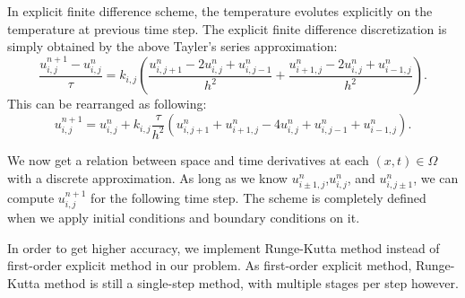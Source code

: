\documentclass[10pt,a4paper]{report}
\begin{document}
In explicit finite difference scheme, the temperature evolutes explicitly on the temperature at previous time step. The explicit finite difference discretization is simply obtained by the above Tayler's series approximation: 
\begin{equation}
{\frac{u^{n+1}_{i,j}-u^n_{i,j}}{\tau}}=k_{i,j}({\frac{u^n_{i,j+1}-2u^n_{i,j}+u^n_{i,j-1}}{h^2}}+{\frac{u^n_{i+1,j}-2u^n_{i,j}+u^n_{i-1,j}}{h^2}}).
\end{equation}
\[\]
This can be rearranged as following:
\begin{equation}
u^{n+1}_{i,j}=u^{n}_{i,j}+k_{i,j}{\frac{\tau}{h^2}}(u^n_{i,j+1}+u^n_{i+1,j}-4u^n_{i,j}+u^n_{i,j-1}+u^n_{i-1,j}).
\end{equation}
\[\]

We now get a relation between space and time derivatives at each $(x,t)\in \Omega$ with a discrete approximation. As long as we know $u^n_{i\pm 1,j}$,$u^n_{i,j}$, and $u^n_{i,j\pm 1}$, we can compute $u^{n+1}_{i,j}$ for the following time step. The scheme is completely defined when we apply initial conditions and boundary conditions on it.

In order to get higher accuracy, we implement Runge-Kutta method instead of first-order explicit method in our problem. As first-order explicit method, Runge-Kutta method is still a single-step method, with multiple stages per step however. 
\end{document}
